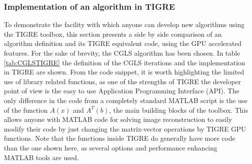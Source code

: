 \subsubsection{Implementation of an algorithm in TIGRE}
To demonstrate the facility with which anyone can develop new algorithms using the
TIGRE toolbox, this section presents a side by side comparison of an algorithm definition and its TIGRE equivalent code, using the GPU accelerated features. For the
sake of brevity, the CGLS algorithm has been chosen.
In table \ref{tab:CGLSTIGRE} the definition of the CGLS iterations and the implementation in TIGRE
are shown. From the code snippet, it is worth highlighting the limited use of library related
functions, as one of the strengths of TIGRE the developer point of view is the
easy to use Application Programming Interface (API). The only difference in the code
from a completely standard MATLAB script is the use of the function $A(x)$ and $A^T(b)$,
the main building blocks of the toolbox. This allows anyone
with MATLAB code for solving image reconstruction to easily modify their code by just
changing the matrix-vector operations by TIGRE GPU functions. Note that the functions inside TIGRE do generally have more code than the one shown here, as several options and performance enhancing MATLAB tools are used.



